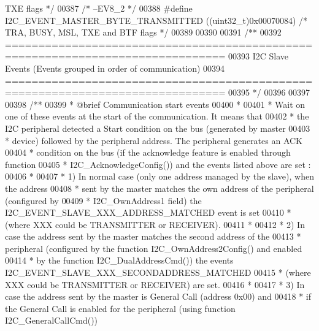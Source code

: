 \begin{DoxyCode}
{       TXE flags */}
00387 \textcolor{comment}{/* --EV8\_2 */}
00388 \textcolor{preprocessor}{#}\textcolor{preprocessor}{define}  \textcolor{preprocessor}{I2C\_EVENT\_MASTER\_BYTE\_TRANSMITTED}                 \textcolor{preprocessor}{(}\textcolor{preprocessor}{(}\textcolor{preprocessor}{uint32\_t}\textcolor{preprocessor}{)}0x00070084\textcolor{preprocessor}{)}  \textcolor{comment}{/* TRA, BUSY, MSL,
       TXE and BTF flags */}
00389 
00390 
00391 \textcolor{comment}{/**}
00392 \textcolor{comment}{ ===============================================================================}
00393 \textcolor{comment}{               I2C Slave Events (Events grouped in order of communication)}
00394 \textcolor{comment}{ ===============================================================================}
00395 \textcolor{comment}{ */}
00396 
00397 
00398 \textcolor{comment}{/** }
00399 \textcolor{comment}{  * @brief  Communication start events}
00400 \textcolor{comment}{  * }
00401 \textcolor{comment}{  * Wait on one of these events at the start of the communication. It means that }
00402 \textcolor{comment}{  * the I2C peripheral detected a Start condition on the bus (generated by master }
00403 \textcolor{comment}{  * device) followed by the peripheral address. The peripheral generates an ACK }
00404 \textcolor{comment}{  * condition on the bus (if the acknowledge feature is enabled through function }
00405 \textcolor{comment}{  * I2C\_AcknowledgeConfig()) and the events listed above are set :}
00406 \textcolor{comment}{  *  }
00407 \textcolor{comment}{  * 1) In normal case (only one address managed by the slave), when the address }
00408 \textcolor{comment}{  *   sent by the master matches the own address of the peripheral (configured by }
00409 \textcolor{comment}{  *   I2C\_OwnAddress1 field) the I2C\_EVENT\_SLAVE\_XXX\_ADDRESS\_MATCHED event is set }
00410 \textcolor{comment}{  *   (where XXX could be TRANSMITTER or RECEIVER).}
00411 \textcolor{comment}{  *    }
00412 \textcolor{comment}{  * 2) In case the address sent by the master matches the second address of the }
00413 \textcolor{comment}{  *   peripheral (configured by the function I2C\_OwnAddress2Config() and enabled }
00414 \textcolor{comment}{  *   by the function I2C\_DualAddressCmd()) the events I2C\_EVENT\_SLAVE\_XXX\_SECONDADDRESS\_MATCHED }
00415 \textcolor{comment}{  *   (where XXX could be TRANSMITTER or RECEIVER) are set.}
00416 \textcolor{comment}{  *   }
00417 \textcolor{comment}{  * 3) In case the address sent by the master is General Call (address 0x00) and }
00418 \textcolor{comment}{  *   if the General Call is enabled for the peripheral (using function I2C\_GeneralCallCmd()) }

\end{DoxyCode}
